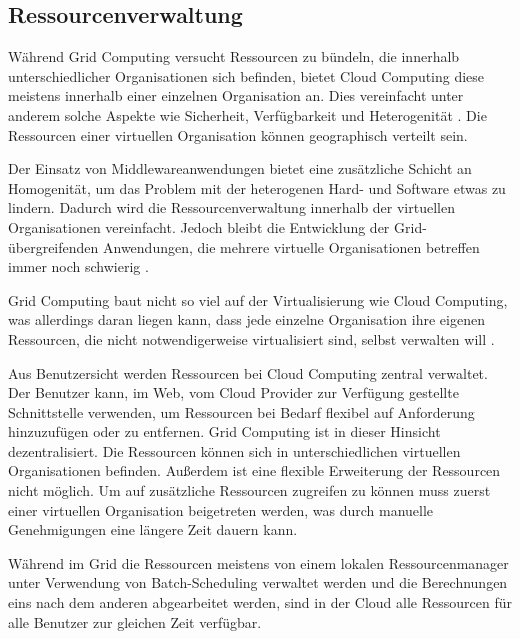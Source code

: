 
\subsection{Ressourcenverwaltung}
Während Grid Computing versucht Ressourcen zu bündeln, die innerhalb unterschiedlicher Organisationen sich befinden, bietet Cloud Computing diese meistens innerhalb einer einzelnen Organisation an. Dies vereinfacht unter anderem solche Aspekte wie Sicherheit, Verfügbarkeit und Heterogenität \cite{comp-cloud-grid-cluster-virt}.
Die Ressourcen einer virtuellen Organisation können geographisch verteilt sein.

Der Einsatz von Middlewareanwendungen bietet eine zusätzliche Schicht an Homogenität, um das Problem mit der heterogenen Hard- und Software etwas zu lindern. Dadurch wird die Ressourcenverwaltung innerhalb der virtuellen Organisationen vereinfacht. Jedoch bleibt die Entwicklung der Grid-übergreifenden Anwendungen, die mehrere virtuelle Organisationen betreffen immer noch schwierig \cite{McEvoy:2008:UCA:1462704.1462715}.

Grid Computing baut nicht so viel auf der Virtualisierung wie Cloud Computing, was allerdings daran liegen kann, dass jede einzelne Organisation ihre eigenen Ressourcen, die nicht notwendigerweise virtualisiert sind, selbst verwalten will \cite{360-degree-compared}. 

Aus Benutzersicht werden Ressourcen bei Cloud Computing zentral verwaltet.
Der Benutzer kann, im Web, vom Cloud Provider zur Verfügung gestellte Schnittstelle verwenden,
um Ressourcen bei Bedarf flexibel auf Anforderung hinzuzufügen oder zu entfernen.
Grid Computing ist in dieser Hinsicht dezentralisiert. Die Ressourcen können sich in unterschiedlichen virtuellen Organisationen befinden. Außerdem ist eine flexible Erweiterung der Ressourcen nicht möglich. Um auf zusätzliche Ressourcen zugreifen zu können muss zuerst einer virtuellen Organisation beigetreten werden, was durch manuelle Genehmigungen eine längere Zeit dauern kann.

Während im Grid die Ressourcen meistens von einem lokalen Ressourcenmanager unter Verwendung von Batch-Scheduling verwaltet werden und die Berechnungen eins nach dem anderen abgearbeitet werden, sind in der Cloud alle Ressourcen für alle Benutzer zur gleichen Zeit verfügbar\cite{360-degree-compared}.



